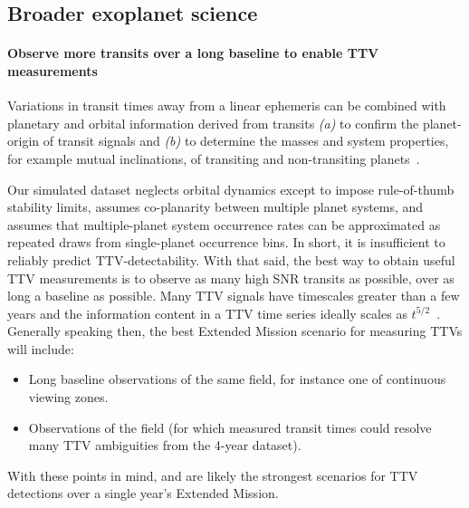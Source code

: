 \subsection{Broader exoplanet science}
\label{sec:broader_exoplanet_science}

\paragraph{Observe more transits over a long baseline to enable TTV measurements}
Variations in transit times away from a linear ephemeris can be combined with planetary and orbital information derived from transits \textit{(a)} to confirm the planet-origin of transit signals and \textit{(b)} to determine the masses and system properties, for example mutual inclinations, of transiting and non-transiting planets~\citep{agol_detecting_2005}.

Our simulated dataset neglects orbital dynamics except to impose rule-of-thumb stability limits, assumes co-planarity between multiple planet systems, and assumes that multiple-planet system occurrence rates can be approximated as repeated draws from single-planet occurrence bins.
In short, it is insufficient to reliably predict TTV-detectability.
With that said, the best way to obtain useful TTV measurements is to observe as many high SNR transits as possible, over as long a baseline as possible.
Many TTV signals have timescales greater than a few years
and the information content in a TTV time series ideally scales as $t^{5/2}$~\citep{fabrycky_whitepaper_2013}.
Generally speaking then, the best Extended Mission scenario for measuring TTVs will include:
\begin{itemize}
	\item Long baseline observations of the same field, for instance one of \tesss continuous viewing zones.
	\item Observations of the \kepler field (for which measured transit times could resolve many TTV ambiguities from the 4-year dataset).
\end{itemize}
With these points in mind, \npole\:and \npole\:are likely the strongest scenarios for TTV detections over a single year's Extended Mission.

\begin{comment}
\textbf{Focus on compact multiple-planet systems}
\citet{muirhead_kepler-445_2015} estimate that $21^{+7}_{-5}\%$ of mid-M dwarfs host multiple planets with periods of less than 10 days.
\end{comment}



